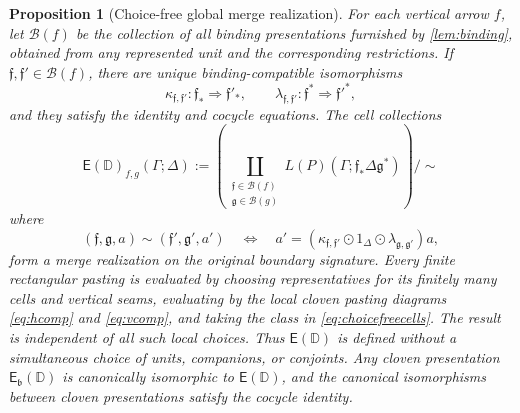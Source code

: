\documentclass[11pt,reqno]{amsart}
\theoremstyle{plain}
\newtheorem{proposition}[theorem]{Proposition}
\theoremstyle{definition}
\theoremstyle{remark}
\numberwithin{equation}{section}
\newcommand{\D}{\mathbb D}
\newcommand{\E}{\mathsf E}
\newcommand{\cell}{\mathrel{\Longrightarrow}}
\newcommand{\wh}{\mathbin{\odot}}
\begin{document}
\begin{proposition}[Choice-free global merge realization]\label{prop:choices}
For each vertical arrow $f$, let $\mathcal B(f)$ be the collection of all
binding presentations furnished by \cref{lem:binding}, obtained from any
represented unit and the corresponding restrictions. If
$\mathfrak f,\mathfrak f'\in\mathcal B(f)$, there are unique
binding-compatible isomorphisms
\[
 \kappa_{\mathfrak f,\mathfrak f'}:
 \mathfrak f_*\cell\mathfrak f'_*,\qquad
 \lambda_{\mathfrak f,\mathfrak f'}:
 \mathfrak f^*\cell\mathfrak f'^*,
\]
and they satisfy the identity and cocycle equations. The cell collections
\begin{equation}\label{eq:choicefreecells}
 \E(\D)_{f,g}(\Gamma;\Delta)
 :=
 \left(
 \coprod_{\substack{\mathfrak f\in\mathcal B(f)\\
                     \mathfrak g\in\mathcal B(g)}}
 L(P)(\Gamma;\mathfrak f_*\Delta\mathfrak g^*)
 \right)\big/\!\sim
\end{equation}
where
\begin{equation}\label{eq:choicefreerel}
 (\mathfrak f,\mathfrak g,a)\sim
 (\mathfrak f',\mathfrak g',a')
 \quad\Longleftrightarrow\quad
 a'=(\kappa_{\mathfrak f,\mathfrak f'}\wh1_\Delta\wh
        \lambda_{\mathfrak g,\mathfrak g'})a,
\end{equation}
form a merge realization on the original boundary signature. Every finite
rectangular pasting is evaluated by choosing representatives for its
finitely many cells and vertical seams, evaluating by the local cloven
pasting diagrams \eqref{eq:hcomp} and \eqref{eq:vcomp}, and taking the class in
\cref{eq:choicefreecells}. The result is independent of all such local
choices. Thus $\E(\D)$ is defined without a simultaneous choice of units,
companions, or conjoints. Any cloven presentation
$\E_{\mathfrak b}(\D)$ is canonically isomorphic to $\E(\D)$, and the
canonical isomorphisms between cloven presentations satisfy the cocycle
identity.
\end{proposition}
\end{document}
